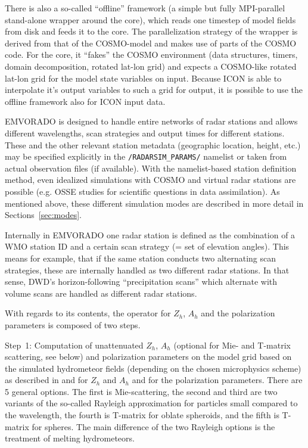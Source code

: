 \documentclass[10pt,a4paper,twoside,headinclude,footinclude,parskip=half]{scrartcl}
\newcommand{\citeP}[1]{\citet{#1}}
\newcommand{\srcform}[1]{\mbox{\texttt{#1}}\xspace}%
\begin{document}
There is also a so-called ``offline'' framework (a simple but fully MPI-parallel stand-alone wrapper around the core), which reads
one timestep of model fields from disk and feeds it to the core. The parallelization strategy of the wrapper is derived from
that of the COSMO-model and makes use of parts of the COSMO code. For the core, it ``fakes'' the COSMO environment (data structures,
timers, domain decomposition, rotated lat-lon grid) and expects a COSMO-like rotated lat-lon grid for the model state variables on input.
Because ICON is able to interpolate it's output variables to such a grid for output, it is possible to use the offline framework also for ICON input data.

EMVORADO is designed to handle entire networks of radar stations and allows different
wavelengths, scan strategies and output times for different stations. These and the
other relevant station metadata (geographic location, height, etc.) may be specified
explicitly in the \srcform{/RADARSIM_PARAMS/} namelist or taken from actual
observation files (if available). With the namelist-based station definition method,
even idealized simulations with COSMO and virtual radar stations are possible
(e.g. OSSE studies for scientific questions in data assimilation).
As mentioned above, these different simulation modes are described in more detail in Sections~\ref{sec:modes}.

Internally in EMVORADO one radar station is defined as the combination of a WMO station ID and a certain scan strategy (= set of elevation angles).
This means for example, that if the same station conducts two alternating scan strategies, these are internally handled as two different radar stations.
In that sense, DWD's horizon-following ``precipitation scans'' which alternate with volume scans are handled as different radar stations.


With regards to its contents, the operator for $Z_h$, $A_h$ and the polarization parameters is composed of two steps.

Step~1: Computation of unattenuated $Z_h$, $A_h$ (optional for Mie- and T-matrix scattering, see below) and polarization parameters
on the model grid based on the simulated hydrometeor fields (depending on the chosen
microphysics scheme) as described in \citeP{blahak2016a} and \citeP{zeng2016a} for $Z_h$ and $A_h$ and \citeP{ryzhkov2011} for the polarization parameters.
There are 5 general options. The first is Mie-scattering, the second and third are two
variants of the so-called Rayleigh approximation for particles small compared to the wavelength, the fourth is T-matrix for oblate spheroids, and the fifth is T-matrix for spheres.
The main difference of the two Rayleigh options is the treatment of melting hydrometeors.
\end{document}
